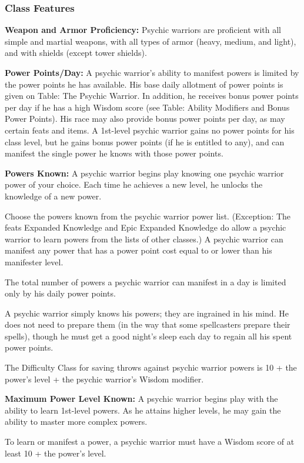 \subsubsection{Class Features}

\textbf{Weapon and Armor Proficiency:} Psychic warriors are proficient with all simple and martial weapons, with all types of armor (heavy, medium, and light), and with shields (except tower shields).

\textbf{Power Points/Day:} A psychic warrior’s ability to manifest powers is limited by the power points he has available. His base daily allotment of power points is given on Table: The Psychic Warrior. In addition, he receives bonus power points per day if he has a high Wisdom score (see Table: Ability Modifiers and Bonus Power Points). His race may also provide bonus power points per day, as may certain feats and items. A 1st-level psychic warrior gains no power points for his class level, but he gains bonus power points (if he is entitled to any), and can manifest the single power he knows with those power points.

\textbf{Powers Known:} A psychic warrior begins play knowing one psychic warrior power of your choice. Each time he achieves a new level, he unlocks the knowledge of a new power.

Choose the powers known from the psychic warrior power list. (Exception: The feats Expanded Knowledge and Epic Expanded Knowledge do allow a psychic warrior to learn powers from the lists of other classes.) A psychic warrior can manifest any power that has a power point cost equal to or lower than his manifester level.

The total number of powers a psychic warrior can manifest in a day is limited only by his daily power points.

A psychic warrior simply knows his powers; they are ingrained in his mind. He does not need to prepare them (in the way that some spellcasters prepare their spells), though he must get a good night’s sleep each day to regain all his spent power points.

The Difficulty Class for saving throws against psychic warrior powers is 10 + the power’s level + the psychic warrior’s Wisdom modifier.

\textbf{Maximum Power Level Known:} A psychic warrior begins play with the ability to learn 1st-level powers. As he attains higher levels, he may gain the ability to master more complex powers.

To learn or manifest a power, a psychic warrior must have a Wisdom score of at least 10 + the power’s level.


